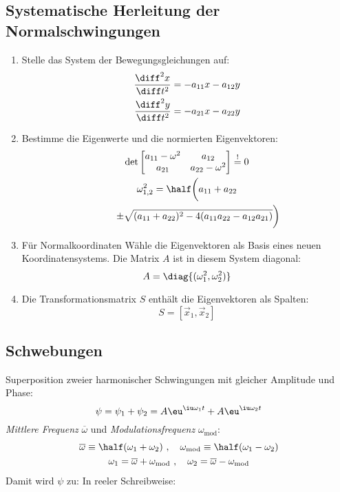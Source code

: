 	\subsection{Systematische Herleitung der Normalschwingungen} %
		\begin{enumerate}
			\item Stelle das System der Bewegungsgleichungen auf:
				\begin{align*}
					\frac{\diff^2 x}{\diff t^2} &= -a_{11}x - a_{12}y \\
					\frac{\diff^2 y}{\diff t^2} &= -a_{21}x - a_{22}y
				\end{align*}
			\item Bestimme die Eigenwerte und die normierten Eigenvektoren:
				\begin{gather*}
					\det \begin{bmatrix}
						a_{11} - \omega^2 & a_{12} \\
						a_{21} & a_{22} - \omega^2
					\end{bmatrix} \overset{!}= 0 \\
					\omega_{1,2}^2 = \half \bigg{(}a_{11} + a_{22} \\
					\qquad\  \pm \sqrt{(a_{11} + a_{22})^2 - 4(a_{11} a_{22} - a_{12} a_{21})}\bigg{)}
				\end{gather*}
			\item Für Normalkoordinaten Wähle die Eigenvektoren als Basis eines neuen Koordinatensystems. Die Matrix $A$ ist in diesem System diagonal:
				\[
					A = \diag{(\omega_1^2, \omega_2^2)}
				\]
			\item Die Transformationsmatrix $S$ enthält die Eigenvektoren als Spalten:
				\[
					S = \left[
						\vec x_1, \vec x_2
					\right]
				\]
		\end{enumerate}
	\subsection{Schwebungen} %
		Superposition zweier harmonischer Schwingungen mit gleicher Amplitude und Phase:
		\[
			\psi = \psi_1 + \psi_2 = A\eu^{\iu\omega_1 t} + A\eu^{\iu\omega_2 t}
		\]
		\emph{Mittlere Frequenz} $\overline\omega$ und \emph{Modulationsfrequenz} $\omega_\text{mod}$:
		\begin{gather*}
			\overline\omega \equiv \half (\omega_1 + \omega_2) \ ,\quad \omega_\text{mod} \equiv \half (\omega_1 - \omega_2) \\
			\omega_1 = \overline\omega + \omega_\text{mod} \ , \quad \omega_2 = \overline\omega - \omega_\text{mod}
		\end{gather*}
		Damit wird $\psi$ zu:
		In reeler Schreibweise:
		
